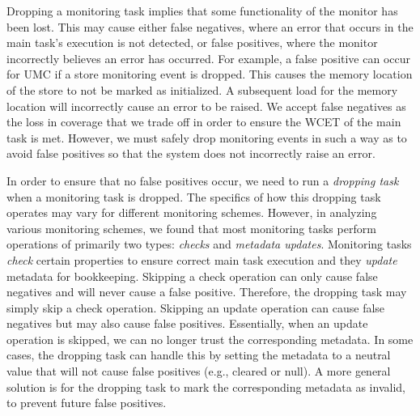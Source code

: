 Dropping a monitoring task implies that some functionality of the monitor has
been lost.  This may cause either false negatives, where an error that occurs
in the main task's execution is not detected, or false positives, where the
monitor incorrectly believes an error has occurred.  For example, a false
positive can occur for UMC if a store monitoring event is dropped. This causes
the memory location of the store to not be marked as initialized. A subsequent
load for the memory location will incorrectly cause an error to be raised.  We
accept false negatives as the loss in coverage that we trade off in order to
ensure the WCET of the main task is met. However, we must safely drop
monitoring events in such a way as to avoid false positives so that the system
does not incorrectly raise an error.

In order to ensure that no false positives occur, we need to run a
\emph{dropping task} when a monitoring task is dropped.  The specifics of how
this dropping task operates may vary for different monitoring schemes. However,
in analyzing various monitoring schemes, we found that most monitoring tasks
perform operations of primarily two types: \emph{checks} and \emph{metadata
updates}. Monitoring tasks \emph{check} certain properties to ensure correct
main task execution and they \emph{update} metadata for bookkeeping. Skipping a
check operation can only cause false negatives and will never cause a false
positive. Therefore, the dropping task may simply skip a check operation.
Skipping an update operation can cause false negatives but may also cause false
positives.  Essentially, when an update operation is skipped, we can no longer
trust the corresponding metadata. In some cases, the dropping task can handle
this by setting the metadata to a neutral value that will not cause false
positives (e.g., cleared or null). A more general solution is for the dropping
task to mark the corresponding metadata as invalid, to prevent future false
positives.


